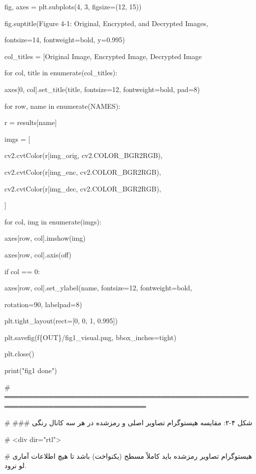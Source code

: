 fig, axes = plt.subplots(4, 3, figsize=(12, 15))

fig.suptitle(\textquotesingle Figure 4-1: Original, Encrypted, and Decrypted Images\textquotesingle,

fontsize=14, fontweight=\textquotesingle bold\textquotesingle, y=0.995)

col\_titles = {[}\textquotesingle Original Image\textquotesingle, \textquotesingle Encrypted Image\textquotesingle, \textquotesingle Decrypted Image\textquotesingle{]}

for col, title in enumerate(col\_titles):

axes{[}0, col{]}.set\_title(title, fontsize=12, fontweight=\textquotesingle bold\textquotesingle, pad=8)

for row, name in enumerate(NAMES):

r = results{[}name{]}

imgs = {[}

cv2.cvtColor(r{[}\textquotesingle img\_orig\textquotesingle{]}, cv2.COLOR\_BGR2RGB),

cv2.cvtColor(r{[}\textquotesingle img\_enc\textquotesingle{]}, cv2.COLOR\_BGR2RGB),

cv2.cvtColor(r{[}\textquotesingle img\_dec\textquotesingle{]}, cv2.COLOR\_BGR2RGB),

{]}

for col, img in enumerate(imgs):

axes{[}row, col{]}.imshow(img)

axes{[}row, col{]}.axis(\textquotesingle off\textquotesingle)

if col == 0:

axes{[}row, col{]}.set\_ylabel(name, fontsize=12, fontweight=\textquotesingle bold\textquotesingle,

rotation=90, labelpad=8)

plt.tight\_layout(rect={[}0, 0, 1, 0.995{]})

plt.savefig(f\textquotesingle\{OUT\}/fig1\_visual.png\textquotesingle, bbox\_inches=\textquotesingle tight\textquotesingle)

plt.close()

print("fig1 done")

\# ═══════════════════════════════════════════════════════════════════════════════

\# \#\#\# شکل ۴-۲: مقایسه هیستوگرام تصاویر اصلی و رمزشده در هر سه کانال رنگی

\# \textless div dir="rtl"\textgreater{}

\# هیستوگرام تصاویر رمزشده باید کاملاً مسطح (یکنواخت) باشد تا هیچ اطلاعات آماری لو نرود.

